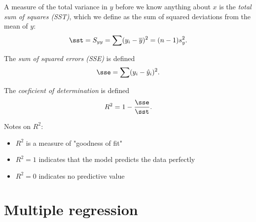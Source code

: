 \documentclass{article}
\renewcommand{\bar}{\overline}
\begin{document}
\begin{definition}
	A measure of the total variance in $y$ before we know anything
	about $x$ is the \emph{total sum of squares (SST)}, which we define
	as the sum of squared deviations from the mean of $y$:
	\begin{align*}
		\sst = S_{yy} = \sum (y_i - \bar y)^2 = (n-1)s^2_y.
	\end{align*}
\end{definition}
\begin{definition}
	The \emph{sum of squared errors (SSE)} is defined
	\begin{align*}
		\sse = \sum (y_i -\hat y_i)^2.
	\end{align*}
\end{definition}
\begin{definition}
	The \emph{coeficient of determination} is defined
	\begin{align*}
		R^2 = 1-\frac{\sse}{\sst}.
	\end{align*}
\end{definition}
Notes on $R^2$:
\begin{itemize}
	\item $R^2$ is a measure of "goodness of fit"
	\item $R^2=1$ indicates that the model predicts the data perfectly
	\item $R^2=0$ indicates no predictive value
\end{itemize}


\section{Multiple regression}
\end{document}
